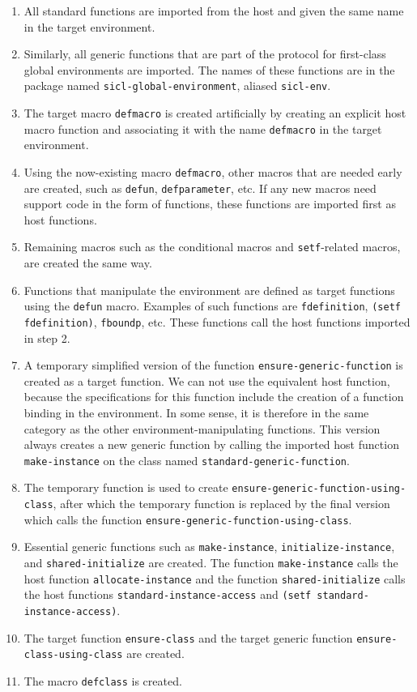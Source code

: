 \begin{enumerate}
\item All standard \commonlisp{} functions are imported from the host
  and given the same name in the target environment.
\item Similarly, all generic functions that are part of the protocol
  for first-class global environments are imported.  The names of
  these functions are in the package named
  \texttt{sicl-global-environment}, aliased \texttt{sicl-env}.
\item The target macro \texttt{defmacro} is created artificially by
  creating an explicit host macro function and associating it with the
  name \texttt{defmacro} in the target environment.
\item Using the now-existing macro \texttt{defmacro}, other macros
  that are needed early are created, such as \texttt{defun},
  \texttt{defparameter}, etc.  If any new macros need support code in
  the form of functions, these functions are imported first as host
  functions.
\item Remaining macros such as the conditional macros and
  \texttt{setf}-related macros, are created the same way.
\item Functions that manipulate the environment are defined as target
  functions using the \texttt{defun} macro.  Examples of such
  functions are \texttt{fdefinition}, \texttt{(setf fdefinition)},
  \texttt{fboundp}, etc.  These functions call the host functions
  imported in step 2.
\item A temporary simplified version of the function
  \texttt{ensure-generic-function} is created as a target function.
  We can not use the equivalent host function, because the
  specifications for this function include the creation of a function
  binding in the environment.  In some sense, it is therefore in the
  same category as the other environment-manipulating functions.  This
  version always creates a new generic function by calling the
  imported host function \texttt{make-instance} on the class named
  \texttt{standard-generic-function}.
\item The temporary function is used to create
  \texttt{ensure-generic-function-using-class}, after which the
  temporary function is replaced by the final version which calls the
  function \texttt{ensure-generic-function-using-class}.
\item Essential generic functions such as \texttt{make-instance},
  \texttt{initialize-instance}, and \texttt{shared-initialize} are
  created.  The function \texttt{make-instance} calls the host
  function \texttt{allocate-instance} and the function
  \texttt{shared-initialize} calls the host functions
  \texttt{standard-instance-access} and \texttt{(setf
    standard-instance-access)}.
\item The target function \texttt{ensure-class} and the target generic
  function \texttt{ensure-class-using-class} are created.
\item The macro \texttt{defclass} is created.
\end{enumerate}
